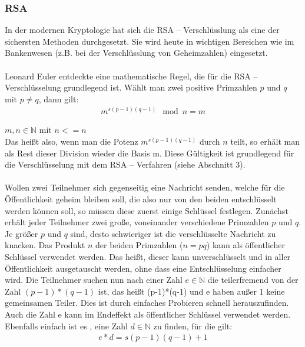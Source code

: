 \subsubsection{RSA}
In der modernen Kryptologie hat sich die RSA – Verschlüsslung als eine der
sichersten Methoden durchgesetzt. Sie wird heute in wichtigen Bereichen wie  im
Bankenwesen (z.B. bei der Verschlüsslung von Geheimzahlen) eingesetzt.
\\\\
Leonard Euler entdeckte eine mathematische Regel, die für die RSA –
Verschlüsselung grundlegend ist. Wählt man zwei positive Primzahlen $p$ und $q$ mit $p \neq q$, dann gilt:
\begin{equation}
	\begin{split}
		m^{s(p-1)(q-1)}\mod n = m
 	\end{split}
\end{equation}

$m,n \in \mathbb N $ mit $n<=n$ \\
Das heißt also, wenn man die Potenz $m^{s(p-1)(q-1)}$
durch $n$ teilt, so erhält man als Rest dieser Division wieder die Basis m. Diese Gültigkeit ist grundlegend für die Verschlüsselung mit dem RSA – Verfahren (siehe Abschnitt 3).
\\\\
Wollen zwei Teilnehmer sich gegenseitig eine Nachricht senden, welche für die
Öffentlichkeit geheim bleiben soll, die also nur von den beiden entschlüsselt werden
können soll, so müssen diese zuerst einige Schlüssel festlegen. Zunächst erhält
jeder Teilnehmer zwei große, voneinander verschiedene Primzahlen $p$ und $q$. Je
größer $p$ und $q$ sind, desto schwieriger ist die verschlüsselte Nachricht zu knacken.
Das Produkt $n$ der beiden Primzahlen ($n = pq$) kann als öffentlicher Schlüssel
verwendet werden. Das heißt, dieser kann unverschlüsselt und in aller Öffentlichkeit
ausgetauscht werden, ohne dass eine Entschlüsselung einfacher wird. 
Die Teilnehmer suchen nun nach einer Zahl $e \in \mathbb{N}$ die teilerfremend von der Zahl
$(p-1)*(q-1)$ ist, das heißt (p-1)*(q-1) und e haben außer 1 keine gemeinsamen Teiler.
Dies ist durch einfaches Probieren schnell herauszufinden. Auch die Zahl e kann im
Endeffekt als öffentlicher Schlüssel verwendet werden. Ebenfalls einfach ist es , eine Zahl $ d \in \mathbb{N}$ zu finden, für die gilt:
\begin{equation}
	\begin{split}
	e*d = s (p-1) (q-1) + 1 
 	\end{split}
\end{equation}

